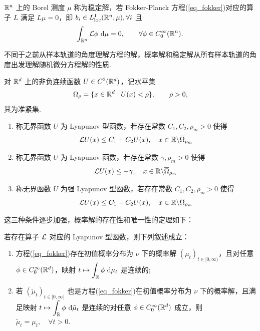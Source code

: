 \begin{definition}[稳定解]
	$\mathbb{R}^n$ 上的 Borel 测度 $\mu$ 称为稳定解，若 Fokker-Planck 方程(\ref{eq_fokker})对应的算子 $L$ 满足 $L\mu = 0$，即
	$b_i \in L^1_{\text{loc}}(\mathbb{R}^n , \mu), \forall i$ 且
	\[
	\int_{\mathbb{R}^n} \mathcal{L} \phi \text{ d} \mu = 0,\qquad  \forall \phi \in C_0^\infty(\mathbb{R}^n).
	\]
\end{definition}

不同于之前从样本轨道的角度理解方程的解，概率解和稳定解从所有样本轨道的角度出发理解随机微分方程解的性质. 







\begin{definition}
	对 $\mathbb{R}^d$ 上的非负连续函数 $U \in C^2(\mathbb{R}^d)$，记水平集
	\[
	\Omega_\rho = \{ x\in \mathbb{R}^d :U(x) < \rho \},\qquad \rho > 0,
	\]
	其为准紧集. 
	\begin{enumerate}
		\item 称无界函数 $U$ 为 Lyapunov 型函数，若存在常数 $C_1,C_2,\rho_m > 0$ 使得
		\[
		\mathcal{L} U(x) \leq C_{1}+C_{2} U(x), \quad x \in \mathbb{R} \backslash \overline {\Omega}_{\rho_{m}}
		\]
		\item 称无界函数 $U$ 为 Lyapunov 函数，若存在常数 $\gamma,\rho_m>0$ 使得
		\[
		\mathcal{L} U(x) \leq-\gamma, \quad x \in \mathbb{R} \backslash \overline {\Omega}_{\rho_{m}}
		\] 
		\item 称无界函数 $U$ 为强 Lyapunov 型函数，若存在常数 $C_1,C_2,\rho_m > 0$ 使得
		\[
		\mathcal{L} U(x) \leq C_{1}-C_{2} U(x), \quad x \in \mathbb{R} \backslash \overline {\Omega}_{\rho_{m}}
		\]
	\end{enumerate}
\end{definition}

这三种条件逐步加强，概率解的存在性和唯一性的定理如下：

\begin{theorem}
	若存在算子 $\mathcal{L}$ 对应的 Lyapunov 型函数，则下列叙述成立：
	\begin{enumerate}
		\item
			方程(\ref{eq_fokker})存在初值概率分布为 $\nu$ 下的概率解 $(\mu_t)_{t\in[0,\infty)}$，且对任意 $\phi \in C_0^\infty(\mathbb{R}^d)$，映射 $t\mapsto \displaystyle \int_{\mathbb{R}} \phi \text{ d} \mu_t$ 是连续的;  
		\item 
			若 $(\tilde \mu_t)_{t\in [0,\infty)}$ 也是方程(\ref{eq_fokker})在初值概率分布为 $\nu$ 下的概率解，且满足映射 $t\mapsto \displaystyle \int_{\mathbb{R}} \phi \text{ d} \tilde\mu_t$ 是连续的对任意 $\phi \in C_0^\infty(\mathbb{R}^d)$ 成立，则 $\tilde \mu_t = \mu_t,\quad  \forall t>0$. 
	\end{enumerate}
\end{theorem}



